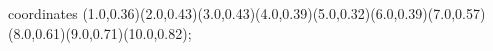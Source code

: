 					coordinates { (1.0,0.36)(2.0,0.43)(3.0,0.43)(4.0,0.39)(5.0,0.32)(6.0,0.39)(7.0,0.57)(8.0,0.61)(9.0,0.71)(10.0,0.82)};